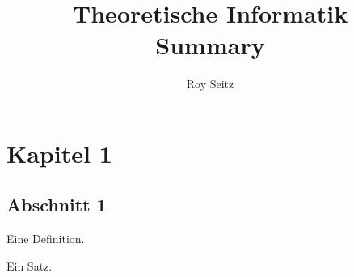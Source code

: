 

\author{Roy Seitz}
\title{Theoretische Informatik\\Summary}

\maketitle
\tableofcontents

\section{Kapitel 1}
\subsection{Abschnitt 1}

\begin{definition}
  Eine Definition.
\end{definition}
\begin{satz}
  Ein Satz.
\end{satz}


